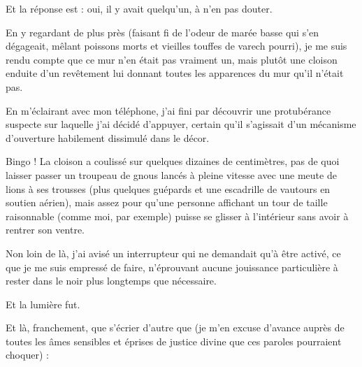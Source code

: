 Et la réponse est : oui, il y avait quelqu’un, à n’en pas douter.

En y regardant de plus près (faisant fi de l’odeur de marée basse qui s’en dégageait, mêlant poissons morts et vieilles touffes de varech pourri), je me suis rendu compte que ce mur n’en était pas vraiment un, mais plutôt une cloison enduite d’un revêtement lui donnant toutes les apparences du mur qu’il n’était pas.

En m’éclairant avec mon téléphone, j’ai fini par découvrir une protubérance suspecte sur laquelle j’ai décidé d’appuyer, certain qu’il s’agissait d’un mécanisme d’ouverture habilement dissimulé dans le décor.

Bingo ! La cloison a coulissé sur quelques dizaines de centimètres, pas de quoi laisser passer un troupeau de gnous lancés à pleine vitesse avec une meute de lions à ses trousses (plus quelques guépards et une escadrille de vautours en soutien aérien), mais assez pour qu’une personne affichant un tour de taille raisonnable (comme moi, par exemple) puisse se glisser à l’intérieur sans avoir à rentrer son ventre.

Non loin de là, j’ai avisé un interrupteur qui ne demandait qu’à être activé, ce que je me suis empressé de faire, n’éprouvant aucune jouissance particulière à rester dans le noir plus longtemps que nécessaire.

Et la lumière fut.

Et là, franchement, que s’écrier d’autre que (je m’en excuse d’avance auprès de toutes les âmes sensibles et éprises de justice divine que ces paroles pourraient choquer) : 

%

\scene

